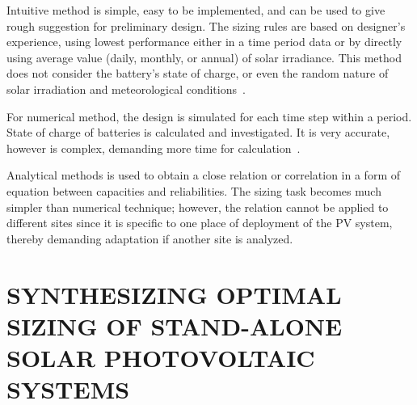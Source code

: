\documentclass[review]{elsarticle}
\begin{document}
Intuitive method is simple, easy to be implemented, and can be used to give 
rough suggestion for preliminary design. The sizing rules are based on designer's experience, 
using lowest performance either in a time period data or by directly using average value 
(daily, monthly, or annual) of solar irradiance. This method does not consider the battery's 
state of charge, or even the random nature of solar irradiation and meteorological conditions~\cite{Alsadi2018}.

For numerical method, the design is simulated for each time step within a period. 
State of charge of batteries is calculated and investigated. It is very accurate, 
however is complex, demanding more time for calculation~\cite{Park2004}.

Analytical methods is used to obtain a close relation or correlation in a form 
of equation between capacities and reliabilities. The sizing task becomes much simpler 
than numerical technique; however, the relation cannot be applied to different sites
since it is specific to one place of deployment of the PV system, 
thereby demanding adaptation if another site is analyzed.

\section{SYNTHESIZING OPTIMAL SIZING OF STAND-ALONE SOLAR PHOTOVOLTAIC SYSTEMS}
\label{sec:Method}
\end{document}
